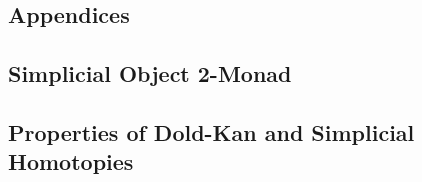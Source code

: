 \begin{subappendices}
    \section{Appendices}

    \subsection{Simplicial Object 2-Monad}\label{sec:simpMon}

    
    
    \subsection{Properties of Dold-Kan and Simplicial Homotopies}\label{sec:doldKan}

    
\end{subappendices}